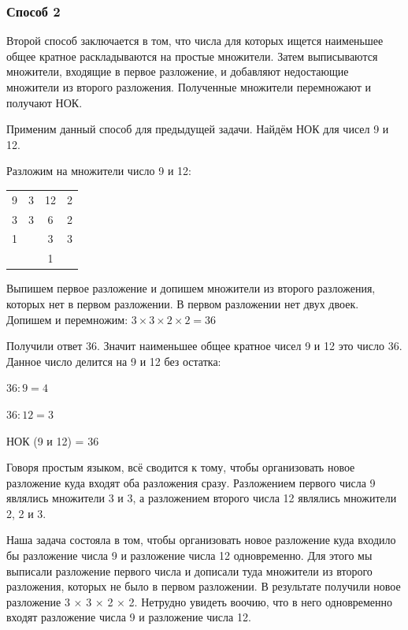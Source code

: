 \documentclass[12pt]{article}
\begin{document}
\subsubsection{Способ 2}
Второй способ заключается в том, что числа для которых ищется наименьшее общее кратное раскладываются на простые множители. Затем выписываются множители, входящие в первое разложение, и добавляют недостающие множители из второго разложения. Полученные множители перемножают и получают НОК.\par
Применим данный способ для предыдущей задачи. Найдём НОК для чисел 9 и 12.\par
Разложим на множители число 9 и 12:\par
\begin{tabular}{c|cc|c}
    9 & 3 & 12 & 2 \\
    3 & 3 & 6  & 2 \\
    1 &   & 3  & 3 \\
      &   & 1
\end{tabular}\par
Выпишем первое  разложение и допишем множители из второго разложения, которых нет в первом разложении. В первом разложении нет двух двоек. Допишем и перемножим: $3 \times 3 \times 2 \times 2 = 36$\par
Получили ответ 36. Значит наименьшее общее кратное чисел 9 и 12 это число 36. Данное число делится на 9 и 12 без остатка:\par
$36 : 9 = 4$\par
$36 : 12 = 3$\par
НОК (9 и 12) = 36\par
Говоря простым языком, всё сводится к тому, чтобы организовать новое разложение куда входят оба разложения сразу. Разложением первого числа 9 являлись множители 3 и 3, а разложением второго числа 12 являлись множители 2, 2 и 3.\par
Наша задача состояла в том, чтобы организовать новое разложение куда входило бы разложение числа 9 и разложение числа 12 одновременно. Для этого мы выписали разложение первого числа и дописали туда множители из второго разложения, которых не было в первом разложении. В результате получили новое разложение 3 × 3 × 2 × 2. Нетрудно увидеть воочию, что в него одновременно входят разложение числа 9 и разложение числа 12.\par
\end{document}
